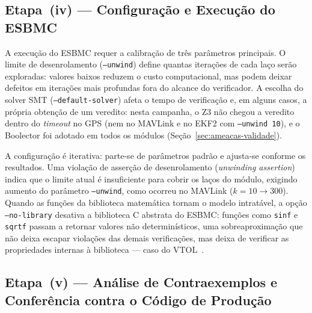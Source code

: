 \subsection{Etapa~(iv) --- Configuração e Execução do ESBMC}

A execução do ESBMC requer a calibração de três parâmetros
principais. O limite de desenrolamento (\texttt{--unwind}) define quantas
iterações de cada laço serão exploradas: valores baixos reduzem o custo
computacional, mas podem deixar defeitos em iterações mais profundas fora do alcance
do verificador.
A escolha do solver SMT (\texttt{--default-solver}) afeta o tempo de
verificação e, em alguns casos, a própria obtenção de um veredito: nesta
campanha, o Z3 não chegou a veredito dentro do \textit{timeout} no GPS (nem no
MAVLink e no EKF2 com \texttt{--unwind 10}), e o Boolector foi adotado em todos
os módulos (Seção~\ref{sec:ameacas-validade}).

A configuração é iterativa: parte-se de parâmetros padrão e ajusta-se conforme
os resultados. Uma violação de asserção de desenrolamento (\textit{unwinding
assertion}) indica que o limite atual é insuficiente para cobrir os laços do
módulo, exigindo aumento do parâmetro \texttt{--unwind}, como ocorreu
no MAVLink ($k = 10 \rightarrow 300$). Quando as funções da biblioteca matemática
tornam o modelo intratável, a opção \texttt{--no-library} desativa a biblioteca C
abstrata do ESBMC: funções como \texttt{sinf} e \texttt{sqrtf} passam a
retornar valores não determinísticos, uma sobreaproximação que não deixa escapar
violações das demais verificações, mas deixa de verificar as propriedades
internas à biblioteca --- caso do VTOL~\cite{Menezes2024}.

\subsection{Etapa~(v) --- Análise de Contraexemplos e Conferência contra o Código de Produção}

